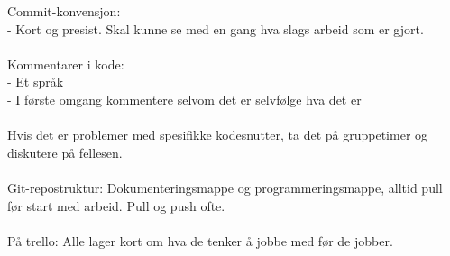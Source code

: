\documentclass[letterpaper,11pt]{article}
\begin{document}
Commit-konvensjon:\\
- Kort og presist. Skal kunne se med en gang hva slags arbeid som er gjort.\\\\
Kommentarer i kode:\\
- Et språk\\
- I første omgang kommentere selvom det er selvfølge hva det er\\\\
Hvis det er problemer med spesifikke kodesnutter, ta det på gruppetimer og diskutere på fellesen.\\\\
Git-repostruktur: Dokumenteringsmappe og programmeringsmappe, alltid pull før start med arbeid. Pull og push ofte.\\\\
På trello: Alle lager kort om hva de tenker å jobbe med før de jobber.
\end{document}
